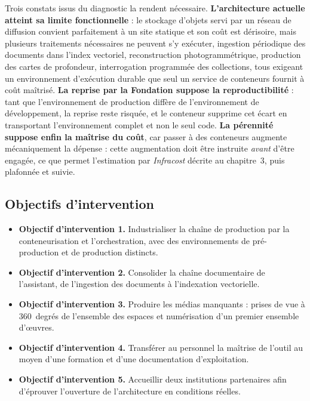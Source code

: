 Trois constats issus du diagnostic la rendent nécessaire.
\textbf{L'architecture actuelle atteint sa limite fonctionnelle} : le stockage
d'objets servi par un réseau de diffusion convient parfaitement à un site
statique et son coût est dérisoire, mais plusieurs traitements nécessaires ne
peuvent s'y exécuter, ingestion périodique des documents dans l'index vectoriel,
reconstruction photogrammétrique, production des cartes de profondeur,
interrogation programmée des collections, tous exigeant un environnement
d'exécution durable que seul un service de conteneurs fournit à coût maîtrisé.
\textbf{La reprise par la Fondation suppose la reproductibilité} : tant que
l'environnement de production diffère de l'environnement de développement, la
reprise reste risquée, et le conteneur supprime cet écart en transportant
l'environnement complet et non le seul code. \textbf{La pérennité suppose enfin
la maîtrise du coût}, car passer à des conteneurs augmente mécaniquement la
dépense : cette augmentation doit être instruite \emph{avant} d'être engagée,
ce que permet l'estimation par \emph{Infracost} décrite au chapitre~3, puis
plafonnée et suivie.

\subsection{Objectifs d'intervention}


\begin{itemize}[label={},leftmargin=0pt,itemsep=5pt,topsep=4pt,parsep=0pt]
  \item \textbf{Objectif d'intervention 1.} Industrialiser la chaîne de production par la
        conteneurisation et l'orchestration, avec des environnements de
        pré-production et de production distincts.
  \item \textbf{Objectif d'intervention 2.} Consolider la chaîne documentaire de l'assistant, de
        l'ingestion des documents à l'indexation vectorielle.
  \item \textbf{Objectif d'intervention 3.} Produire les médias manquants : prises de vue à
        360~degrés de l'ensemble des espaces et numérisation d'un premier
        ensemble d'œuvres.
  \item \textbf{Objectif d'intervention 4.} Transférer au personnel la maîtrise de l'outil au moyen
        d'une formation et d'une documentation d'exploitation.
  \item \textbf{Objectif d'intervention 5.} Accueillir deux institutions partenaires afin d'éprouver
        l'ouverture de l'architecture en conditions réelles.
\end{itemize}

